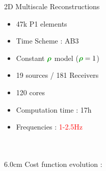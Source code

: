 \begin{frame}{2D Multiscale Reconstructions}

  \begin{multicols}{2}
    \begin{itemize}
    \item 47k P1 elements
    \item Time Scheme : AB3
    \item Constant $\density$ model ($\density=1$)
    \item 19 sources / 181 Receivers
    \item 120 cores
    \item Computation time : 17h
    \item Frequencies : \textcolor{red}{1-2.5Hz} \\ ~ \\ ~
    \end{itemize}
    \columnbreak

    \setlength{\plotwidth} {6.0cm}
    \setlength{\plotheight}{5cm}
    Cost function evolution :
    \begin{figure}
    \end{figure}
  \end{multicols}
\end{frame}

